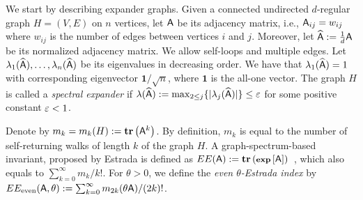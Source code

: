 %
We start by describing expander graphs. Given a connected undirected $d$-regular graph $H=(V,E)$ on $n$ vertices, let ${\mathsf{A} }$ be its adjacency matrix, i.e., ${\mathsf{A} }_{ij}=w_{ij}$ where $w_{ij}$ is the number of edges between vertices $i$ and $j$. Moreover, let $\widehat{{\mathsf{A} }}:=\frac1{d}{\mathsf{A} }$ be its normalized adjacency matrix. We allow self-loops and multiple edges. Let $\lambda_1(\widehat{{\mathsf{A} }}),\ldots ,\lambda_n(\widehat{{\mathsf{A} }})$ be its eigenvalues in decreasing order. We have that $\lambda_1(\widehat{{\mathsf{A} }})=1$ with corresponding eigenvector $\mathbf{1}/\sqrt{n}$, where $\mathbf{1}$ is the all-one vector. The graph $H$ is called a \emph{spectral expander} if $\lambda(\widehat{{\mathsf{A} }}):=\max_{2\leq j}\{ |\lambda_j(\widehat{{\mathsf{A} }})|\}\leq \varepsilon$ for some positive constant $\varepsilon<1$.
%

%
Denote by $m_k=m_k(H):= \operatorname{\textbf{tr}}\left({\mathsf{A} }^k\right)$. By definition, $m_k$ is equal to the number of self-returning walks of length $k$ of the graph $H$. A graph-spectrum-based invariant, proposed by Estrada is defined as $EE({\mathsf{A} }) := \operatorname{\textbf{tr}}\left(\operatorname{\textbf{\footnotesize exp}}\left[{\mathsf{A} }\right]\right)$~\cite{estrada}, which also equals to $\sum_{k=0}^{\infty} m_k/k!$. For $\theta>0$, we define the \emph{even $\theta$-Estrada index} by $EE_{\text{even}}({\mathsf{A} },\theta) := \sum_{k=0}^{\infty}  m_{2k}(\theta {\ensuremath{\mathsf{A} }})/(2k)!$.
%

